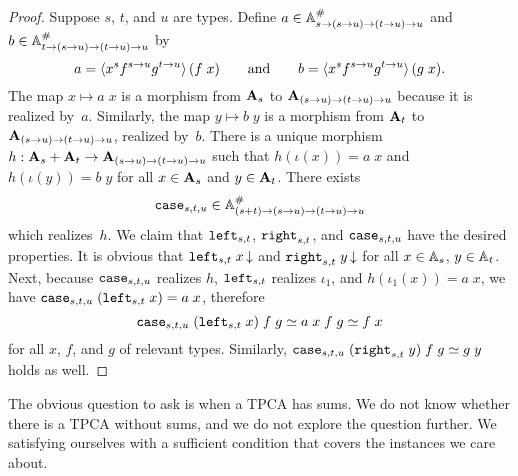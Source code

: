 \begin{proof}
  Suppose $s$, $t$, and $u$ are types. Define $a \in \mathbb{A}^{\#}_{s \to (s
    \to u) \to (t \to u) \to u}$ and $b \in \mathbb{A}^{\#}_{t \to (s \to u)
    \to (t \to u) \to u}$ by
  \begin{equation*}
    a = \langle x^{s}
                 f^{s \to u}
                 g^{t \to u} \rangle\,(f\;x)
   \qquad\text{and}\qquad
    b = \langle x^{s}
                 f^{s \to u}
                 g^{t \to u} \rangle\,(g\;x).
  \end{equation*}
  The map $x \mapsto a\;x$ is a morphism from $\mathbf{A}_s$ to
  $\mathbf{A}_{(s \to u) \to (t \to u) \to u}$ because it is realized
  by~$a$. Similarly, the map $y \mapsto b\;y$ is a morphism from
  $\mathbf{A}_t$ to $\mathbf{A}_{(s \to u) \to (t \to u) \to u}$, realized
  by~$b$. There is a unique morphism $h : \mathbf{A}_s + \mathbf{A}_t \to
  \mathbf{A}_{(s \to u) \to (t \to u) \to u}$ such that $h(\iota(x)) =
  a\;x$ and $h(\iota(y)) = b\;y$ for all $x \in \mathbf{A}_s$ and $y \in
  \mathbf{A}_t$. There exists
  \begin{equation*}
    \mathtt{case}_{s,t,u} \in \mathbb{A}^{\#}_{(s+t) \to (s \to u) \to (t \to u) \to u}
  \end{equation*}
  which realizes~$h$. We claim that $\mathtt{left}_{s,t}$,
  $\mathtt{right}_{s,t}$, and $\mathtt{case}_{s,t,u}$ have the desired
  properties. It is obvious that $\mathtt{left}_{s,t}\;x\,{\downarrow}$ and
  $\mathtt{right}_{s,t}\;y\,{\downarrow}$ for all $x \in \mathbb{A}_{s}$, $y \in
  \mathbb{A}_{t}$. Next, because $\mathtt{case}_{s,t,u}$ realizes $h$,
  $\mathtt{left}_{s,t}$ realizes $\iota_1$, and $h(\iota_1(x)) = a\;x$, we
  have $\mathtt{case}_{s,t,u}\;(\mathtt{left}_{s,t}\;x) = a\;x$, therefore
  \begin{equation*}
    \mathtt{case}_{s,t,u}\;(\mathtt{left}_{s,t}\;x)\;f\;g \simeq
    a\;x\;f\;g \simeq f\;x
  \end{equation*}
  for all $x$, $f$, and $g$ of relevant types. Similarly,
  $\mathtt{case}_{s,t,u}\;(\mathtt{right}_{s,t}\;y)\;f\;g \simeq g\;y$ holds
  as well.
\end{proof}

The obvious question to ask is when a TPCA has sums. We do not know
whether there is a TPCA without sums, and we do not explore the
question further. We satisfying ourselves with a sufficient condition
that covers the instances we care about.


